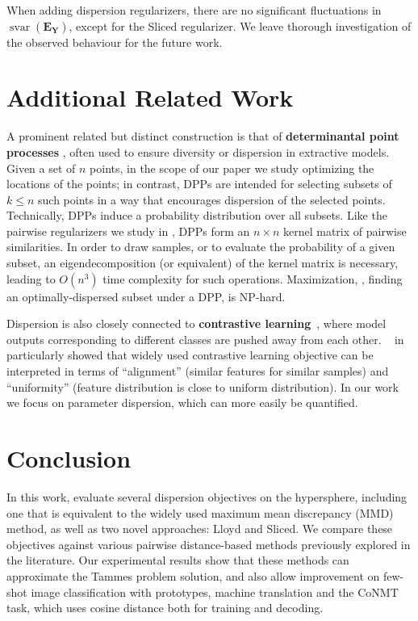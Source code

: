 \documentclass[10pt]{article} %
\begin{document}
When adding dispersion regularizers,
there are no significant fluctuations in $\operatorname{svar}(\mathbf{E_Y})$, except for the Sliced regularizer. We leave thorough investigation of the observed behaviour for the future work.

\section{Additional Related Work}
\label{sec:relwork}

A prominent related but distinct construction is that of 
\textbf{determinantal point processes} \citep{kulesza_determinantal_2012},
often used to ensure diversity or dispersion in extractive models. Given a 
set of $n$ points, in the scope of our paper we study optimizing the locations of the points; in contrast, DPPs are intended for selecting subsets of $k \leq n$ such points in a way that encourages dispersion of the selected points. Technically, DPPs induce a probability distribution over all subsets. Like the pairwise regularizers we study in , DPPs form an $n \times n$ kernel matrix of pairwise similarities. In order to draw samples, or to evaluate the probability of a given subset, an eigendecomposition (or equivalent) of the kernel matrix is necessary, leading to $O(n^3)$ time complexity for such operations. Maximization, \ie, finding an optimally-dispersed subset under a DPP, is NP-hard.

Dispersion is also closely connected to \textbf{contrastive learning}~\citep{chen2020simple,he2020momentum,hjelm2018learning,chen2020big}, where model outputs corresponding to different classes are pushed away from each other. ~\citet{pmlr-v119-wang20k} in particularly showed that widely used contrastive learning objective can be interpreted in terms of ``alignment'' (similar features for similar samples) and ``uniformity'' (feature distribution is close to uniform distribution). In our work we focus on parameter dispersion, which can more easily be quantified.

\section{Conclusion}
In this work, evaluate several dispersion objectives on the hypersphere, including one that is equivalent to the widely used maximum mean discrepancy (MMD) method, as well as two novel approaches: Lloyd and Sliced. We compare these objectives against various pairwise distance-based methods previously explored in the literature. Our experimental results show that these methods can approximate the Tammes problem solution, and also allow improvement on few-shot image classification with prototypes, machine translation and the CoNMT task, which uses cosine distance both for training and decoding. 
\end{document}
